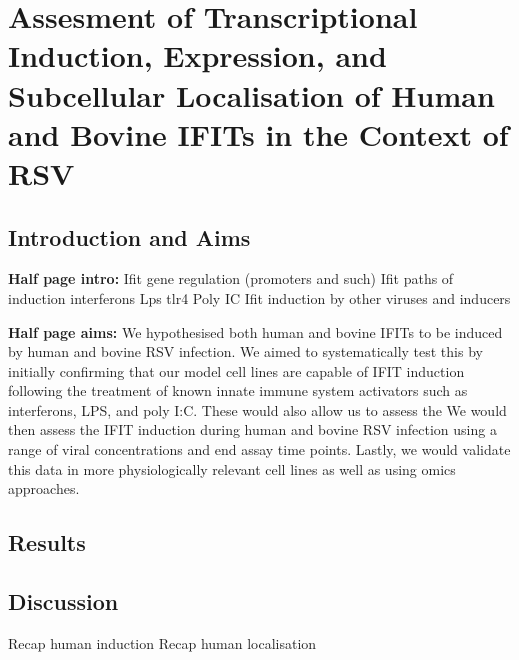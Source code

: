 \chapter{Assesment of Transcriptional Induction, Expression, and Subcellular Localisation of Human and Bovine IFITs in the Context of RSV} \label{Assesment of Transcriptional Induction, Expression, and Subcellular Localisation of Human IFITs in the Context of RSV}
\section{Introduction and Aims} \label{Introduction and Aims}
\textbf{Half page intro:}
Ifit gene regulation (promoters and such) \newline
Ifit paths of induction \newline
interferons \newline
Lps tlr4 \newline
Poly IC \newline
Ifit induction by other viruses and inducers \newline


\textbf{Half page aims:}
We hypothesised both human and bovine IFITs to be induced by human and bovine RSV infection. We aimed to systematically test this by initially confirming that our model cell lines are capable of IFIT induction following the treatment of known innate immune system activators such as interferons, LPS, and poly I:C. These would also allow us to assess the  We would then assess the IFIT induction during human and bovine RSV infection using a range of viral concentrations and end assay time points. Lastly, we would validate this data in more physiologically relevant cell lines as well as using omics approaches.

\section{Results} \label{Results}




\section{Discussion} \label{Discussion}
Recap human induction \newline
Recap human localisation





